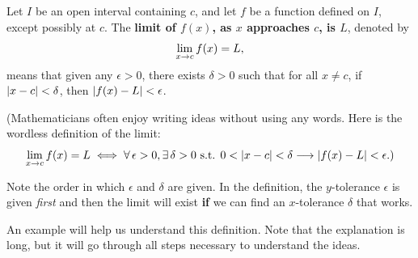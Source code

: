 \begin{definition}\label{def:limit}%
Let $I$ be an open interval containing $c$, and let $f$ be a function defined on $I$, except possibly at $c$. The \textbf{limit of $f(x)$, as $x$ approaches $c$, is $L$}, denoted by
\[\displaystyle\lim_{x\rightarrow c} f(x) = L,\]
means that given any $\epsilon > 0$, there exists $\delta > 0$ such that for all $x\neq c$,  
if  $\left\lvert x - c \right\rvert < \delta$, then $\left\lvert f(x) - L \right\rvert < \epsilon$.
\end{definition}

(Mathematicians often enjoy writing ideas without using any words. Here is the wordless definition of the limit:
\[
\lim_{x\to c} f(x) = L \iff
\forall \, \epsilon > 0, \exists \, \delta > 0 \text{ s.t. }
0<\left\lvert x - c \right\rvert < \delta \longrightarrow \left\lvert f(x) - L \right\rvert < \epsilon\text{.)}
\]

Note the order in which $\epsilon$ and $\delta$ are given.  In the definition, the $y$-tolerance $\epsilon$ is given \emph{first} and then the limit will exist \textbf{if} we can find an $x$-tolerance $\delta$ that works.


An example will help us understand this definition.  Note that the explanation is long, but it will go through all steps necessary to understand the ideas.


